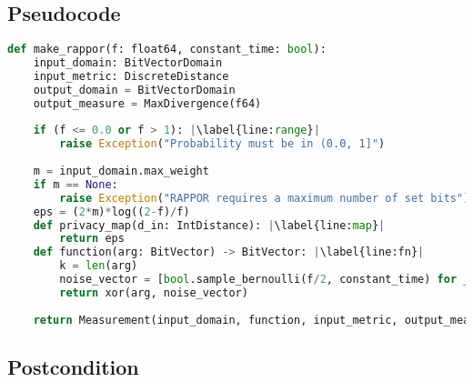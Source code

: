 \documentclass{article}
\begin{document}
\subsection*{Pseudocode}
\begin{lstlisting}[language=Python, escapechar=|]
def make_rappor(f: float64, constant_time: bool):
    input_domain: BitVectorDomain
    input_metric: DiscreteDistance
    output_domain = BitVectorDomain
    output_measure = MaxDivergence(f64)
    
    if (f <= 0.0 or f > 1): |\label{line:range}|
        raise Exception("Probability must be in (0.0, 1]")
    
    m = input_domain.max_weight
    if m == None: 
        raise Exception("RAPPOR requires a maximum number of set bits")
    eps = (2*m)*log((2-f)/f)
    def privacy_map(d_in: IntDistance): |\label{line:map}|
        return eps
    def function(arg: BitVector) -> BitVector: |\label{line:fn}|
    	k = len(arg)
    	noise_vector = [bool.sample_bernoulli(f/2, constant_time) for _ in range(k)]
    	return xor(arg, noise_vector)
    
    return Measurement(input_domain, function, input_metric, output_measure, privacy_map)
\end{lstlisting}

\subsection*{Postcondition}
\end{document}
